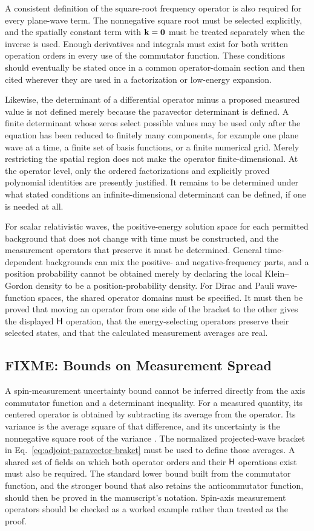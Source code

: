 A consistent definition of the square-root frequency operator is also
required for every plane-wave term. The nonnegative square root must be
selected explicitly, and the spatially constant term with
\(\mathbf{k}=\mathbf{0}\) must be treated separately when the inverse is used.
Enough derivatives and integrals must exist for both written operation orders
in every use of the commutator function. These conditions should eventually
be stated once in a common operator-domain section and then cited wherever
they are used in a factorization or low-energy expansion.

Likewise, the determinant of a differential operator minus a proposed
measured value is not defined merely because the paravector determinant is
defined. A finite determinant whose zeros select possible values may be used
only after the equation has been reduced to finitely many components, for
example one plane wave at a time, a finite set of basis functions, or a
finite numerical grid. Merely restricting the spatial region does not make
the operator finite-dimensional. At the operator level, only the ordered
factorizations and explicitly proved
polynomial identities are presently justified. It remains to be determined
under what stated conditions an infinite-dimensional determinant can be
defined, if one is needed at all.

For scalar relativistic waves, the positive-energy solution space for each
permitted background that does not change with time must be constructed, and
the measurement operators that preserve it must be determined. General
time-dependent backgrounds can mix the positive- and negative-frequency
parts, and a position probability cannot be obtained merely by declaring the
local Klein--Gordon density to be a position-probability density. For Dirac
and Pauli wave-function
spaces, the shared operator domains must be specified. It must then be proved
that moving an operator from one side of the bracket to the other gives the
displayed \(\mathsf H\) operation, that the energy-selecting operators preserve their
selected states, and that the calculated measurement averages are real.

\subsection{FIXME: Bounds on Measurement Spread}
A spin-measurement uncertainty bound cannot be inferred directly from the
axis commutator function and a determinant inequality. For a measured
quantity, its centered operator is obtained by subtracting its average from
the operator. Its variance is the average square of that difference, and its
uncertainty is the nonnegative square root of the variance
\cite{robertson1929,sakurai2017}. The normalized projected-wave bracket in
Eq.\ \eqref{eq:adjoint-paravector-braket} must be used to define those
averages. A shared set of fields on which both operator orders and their
\(\mathsf H\) operations exist must also be required. The standard lower bound built
from the commutator function, and the stronger bound that also retains the
anticommutator function, should then be proved in the manuscript's notation.
Spin-axis measurement operators should be checked as a worked example rather
than treated as the proof.

